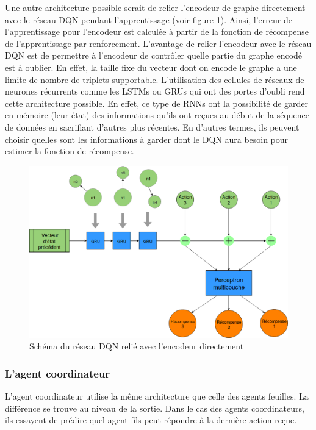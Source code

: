 \par Une autre architecture possible serait de relier l'encodeur de graphe directement avec le réseau DQN pendant l'apprentissage (voir figure \ref{encoder_dqn}). Ainsi, l'erreur de l'apprentissage pour l'encodeur est calculée à partir de la fonction de récompense de l'apprentissage par renforcement. L'avantage de relier l'encodeur avec le réseau DQN est de permettre à l'encodeur de contrôler quelle partie du graphe encodé est à oublier. En effet, la taille fixe du vecteur dont on encode le graphe a une limite de nombre de triplets supportable. L'utilisation des cellules de réseaux de neurones récurrents comme les LSTMs ou GRUs qui ont des portes d'oubli rend cette architecture possible. En effet, ce type de RNNs ont la possibilité de garder en mémoire (leur état) des informations qu'ils ont reçues au début de la séquence de données en sacrifiant d'autres plus récentes. En d'autres termes, ils peuvent choisir quelles sont les informations à garder dont le DQN aura besoin pour estimer la fonction de récompense.
\begin{figure}[H]
	\centering
	\includegraphics[width=0.88\linewidth]{images/Conception/DM/encoder_dqn.png}
	\caption{Schéma du réseau DQN relié avec l'encodeur directement}\label{encoder_dqn}
\end{figure}
\subsubsection*{L'agent coordinateur}
L'agent coordinateur utilise la même architecture que celle des agents feuilles. La différence se trouve au niveau de la sortie. Dans le cas des agents coordinateurs, ils essayent de prédire quel agent fils peut répondre à la dernière action reçue.
